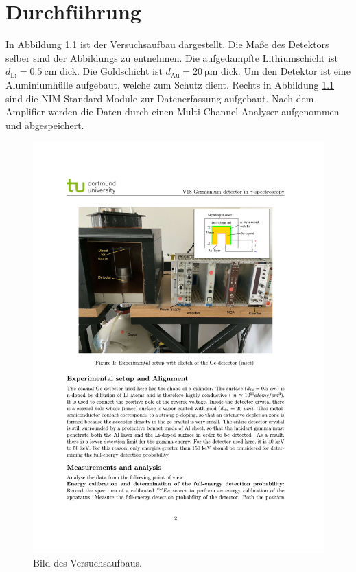 \chapter{Durchführung}
\label{cha:Durchführung}
In Abbildung \ref{fig:aufbau} ist der Versuchsaufbau dargestellt. Die Maße des Detektors selber sind der Abbildungs zu entnehmen. Die aufgedampfte Lithiumschicht ist 
$d_\mathrm{Li} = \qty{0.5}{\centi\metre}$ dick. Die Goldschicht ist $d_\mathrm{Au} = \qty{20}{\micro\metre}$ dick. Um den Detektor ist eine Aluminiumhülle aufgebaut, welche zum 
Schutz dient. Rechts in Abbildung \ref{fig:aufbau} sind die NIM-Standard Module zur Datenerfassung aufgebaut. Nach dem Amplifier werden die Daten durch einen Multi-Channel-Analyser
aufgenommen und abgespeichert.

\begin{figure}
    \centering
    \includegraphics[width = .9\textwidth]{content/pics/aufbau.pdf}
    \caption{Bild des Versuchsaufbaus.}
    \label{fig:aufbau}
\end{figure}


